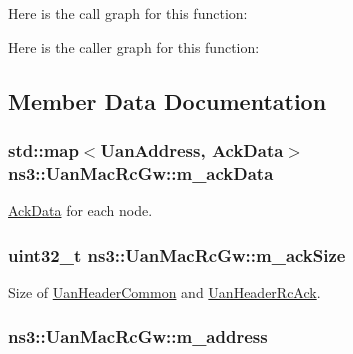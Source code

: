 Here is the call graph for this function\+:




Here is the caller graph for this function\+:




\subsection{Member Data Documentation}
\subsubsection[{\texorpdfstring{m\+\_\+ack\+Data}{m_ackData}}]{\setlength{\rightskip}{0pt plus 5cm}std\+::map$<${\bf Uan\+Address}, {\bf Ack\+Data}$>$ ns3\+::\+Uan\+Mac\+Rc\+Gw\+::m\+\_\+ack\+Data\hspace{0.3cm}{\ttfamily [private]}}\hypertarget{classns3_1_1UanMacRcGw_a08da08fa5109dcd1147ef2c17aa1f061}{}\label{classns3_1_1UanMacRcGw_a08da08fa5109dcd1147ef2c17aa1f061}
\hyperlink{structns3_1_1UanMacRcGw_1_1AckData}{Ack\+Data} for each node. 
\subsubsection[{\texorpdfstring{m\+\_\+ack\+Size}{m_ackSize}}]{\setlength{\rightskip}{0pt plus 5cm}uint32\+\_\+t ns3\+::\+Uan\+Mac\+Rc\+Gw\+::m\+\_\+ack\+Size\hspace{0.3cm}{\ttfamily [private]}}\hypertarget{classns3_1_1UanMacRcGw_af6e2ac2d10617fe1807819b71d7ba61b}{}\label{classns3_1_1UanMacRcGw_af6e2ac2d10617fe1807819b71d7ba61b}


Size of \hyperlink{classns3_1_1UanHeaderCommon}{Uan\+Header\+Common} and \hyperlink{classns3_1_1UanHeaderRcAck}{Uan\+Header\+Rc\+Ack}. 

\subsubsection[{\texorpdfstring{m\+\_\+address}{m_address}}]{ ns3\+::\+Uan\+Mac\+Rc\+Gw\+::m\+\_\+address\hspace{0.3cm}{\ttfamily [private]}}\hypertarget{classns3_1_1UanMacRcGw_aca721ba2f63161e937d0f856f4a566a0}{}\label{classns3_1_1UanMacRcGw_aca721ba2f63161e937d0f856f4a566a0}


